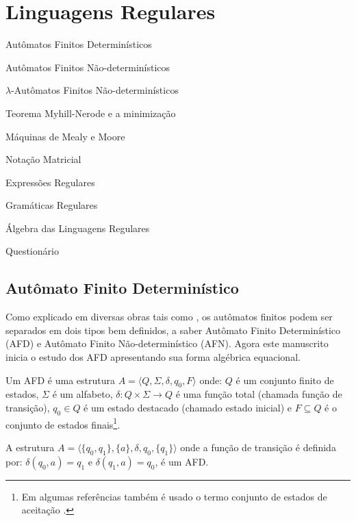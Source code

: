 \chapter{Linguagens Regulares}\label{cap:LinguagemRegulares}

\begin{introduction}[Tópicos]
	\item Autômatos Finitos Determinísticos
	\item Autômatos Finitos Não-determinísticos
	\item $\lambda$-Autômatos Finitos Não-determinísticos
	\item Teorema Myhill-Nerode e a  minimização
	\item Máquinas de Mealy e Moore
	\item Notação Matricial
	\item Expressões Regulares
	\item Gramáticas Regulares
	\item Álgebra das Linguagens Regulares
	\item Questionário
\end{introduction}

\section{Autômato Finito Determinístico}\label{sec:AFD}

Como explicado em diversas obras tais como \cite{benjaLivro2010, hopcroft2008, linz2006, menezes1998LFA}, os autômatos finitos podem ser separados em dois tipos bem definidos, a saber Autômato Finito Determinístico (AFD) e Autômato Finito Não-determinístico (AFN). Agora este manuscrito inicia o estudo dos AFD apresentando sua forma algébrica equacional.

\begin{definition}\label{def:AFD}
	Um AFD é uma estrutura $A = \langle Q, \Sigma, \delta, q_0, F\rangle$ onde: $Q$ é um conjunto finito de estados, $\Sigma$ é um alfabeto, $\delta : Q \times \Sigma \rightarrow Q$ é uma função total (chamada função de transição), $q_0 \in Q$ é um estado destacado (chamado estado inicial) e $F \subseteq Q$ é o conjunto de estados finais\footnote{Em algumas referências também é usado o termo conjunto de estados de aceitação \cite{de2010}.}.
\end{definition}

\begin{example}\label{exe:AFD}
	A estrutura $A = \langle \{q_0, q_1\}, \{a\}, \delta, q_0, \{q_1\} \rangle$ onde a função de transição é definida por: $\delta(q_0, a) = q_1$ e $\delta(q_1, a) = q_0$, é um AFD.
\end{example}

